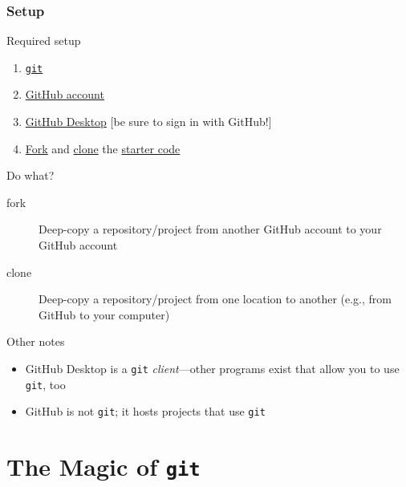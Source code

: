 \documentclass{beamer}
\theoremstyle{example}
\begin{document}
\section{Setup}
\begin{frame}[label=setup]{Required setup}
    \begin{enumerate}
        \item
            \href{https://git-scm.com/book/en/v2/Getting-Started-Installing-Git}
            {\texttt{git}}
        \item
            \href{https://github.com}
            {GitHub account}
        \item \href{https://desktop.github.com}
            {GitHub Desktop} [be sure to sign in with GitHub!]
        \item \href{https://github.com/benknoble/git-wizard-code/fork}{Fork}
            and
            \href{https://help.github.com/en/desktop/contributing-to-projects/cloning-a-repository-from-github-desktop}{clone}
            the
            \href{https://github.com/benknoble/git-wizard-code}{starter code}
    \end{enumerate}
    Do what?
    \begin{description}
        \item[fork] Deep-copy a repository/project from another GitHub account
            to your GitHub account
        \item[clone] Deep-copy a repository/project from one location to
            another (e.g., from GitHub to your computer)
    \end{description}
\end{frame}

\begin{frame}{Other notes}
    \begin{itemize}
        \item GitHub Desktop is a \texttt{git} \emph{client}---other programs
            exist that allow you to use \texttt{git}, too
        \item GitHub is not \texttt{git}; it hosts projects that use
            \texttt{git}
    \end{itemize}
\end{frame}

\part{The Magic of \texttt{git}}
\frame{\partpage}
\frame{\tableofcontents[part=2]}
\end{document}
